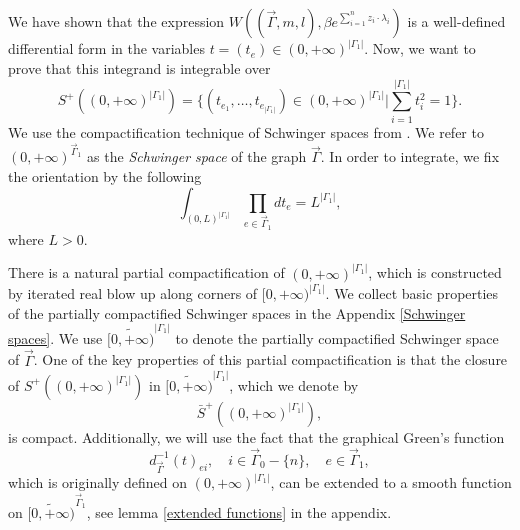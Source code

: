 \documentclass[11pt]{amsart}
\theoremstyle{definition}
\theoremstyle{remark}
\numberwithin{equation}{section}
\begin{document}
We have shown that the expression $W((\vec{\Gamma},m,l),\beta e^{\sum_{i=1}^{n}z_{i}\cdot\lambda_{i}})$ is a
well-defined differential form in the variables $t = (t_e) \in (0,+\infty)^{|\Gamma_1|}$.
Now, we want to prove that this integrand is integrable over 
$$
S^{+}((0,+\infty)^{|\Gamma_{1}|})=\{(t_{e_{1}},\dots,t_{e_{|\Gamma_{1}|}})\in(0,+\infty)^{|\Gamma_{1}|}|\sum_{i=1}^{|\Gamma_{1}|}t_{i}^{2}=1\}.
$$
We use the compactification technique of Schwinger spaces from \cite{Wang:2024tjf}.
We refer to $(0,+\infty)^{\vec{\Gamma}_{1}}$ as the \textit{Schwinger space} of the graph $\vec{\Gamma}$. 
In order to integrate, we fix the orientation by the following 
    $$
    \int_{(0,L)^{|\Gamma_{1}|}}\prod_{e\in\vec{\Gamma}_{1}}dt_{e}=L^{|\Gamma_{1}|},
    $$
    where $L>0$. 

There is a natural partial compactification of $(0,+\infty)^{|\Gamma_{1}|}$, which is constructed by iterated real
blow up along corners of $[0,+\infty)^{|\Gamma_{1}|}$. We collect basic properties of the partially compactified
Schwinger spaces in the Appendix \ref{Schwinger spaces}. We use $\widetilde{[0,+\infty)}^{|\Gamma_{1}|}$ to denote the partially compactified Schwinger space of $\vec{\Gamma}$.
One of the key properties of this partial compactification is that the closure of $S^{+}((0,+\infty)^{|\Gamma_{1}|})$
in $\widetilde{[0,+\infty)}^{|\Gamma_{1}|}$, which we denote by 
    $$
    \bar{S}^{+}((0,+\infty)^{|\Gamma_{1}|}),
    $$
    is compact.
    Additionally, we will use the fact that the graphical Green's function 
    \[
      d^{-1}_{\vec{\Gamma}}(t)_{ei}, \quad i\in \vec{\Gamma}_{0}-\{n\},\quad e\in \vec{\Gamma}_{1} ,
    \]
    which is originally defined on $(0,+\infty)^{|\Gamma_1|}$, can be extended to a smooth function on $\widetilde{[0,
    +\infty)}^{\vec{\Gamma}_{1}}$, see lemma \ref{extended functions} in the appendix.
\end{document}
